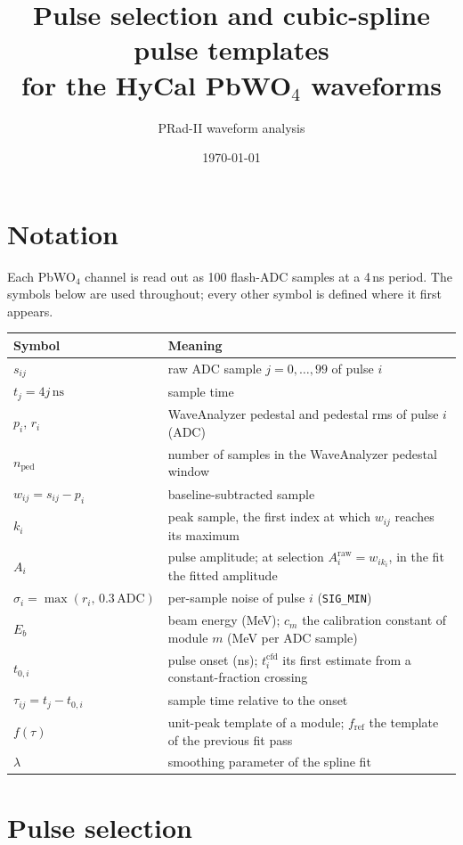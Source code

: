 \documentclass[11pt]{article}
\title{Pulse selection and cubic-spline pulse templates\\ for the HyCal PbWO$_4$ waveforms}
\author{PRad-II waveform analysis}
\date{\today}
\newcommand{\ns}{\,\mathrm{ns}}
\newcommand{\adc}{\,\mathrm{ADC}}
\newcommand{\code}[1]{\texttt{#1}}
\begin{document}
\maketitle

\section{Notation}

Each PbWO$_4$ channel is read out as 100 flash-ADC samples at a 4\,ns period. The symbols below are used throughout; every other symbol is defined where it first appears.

\begin{center}
\begin{tabular}{lp{}}
\toprule
Symbol & Meaning \\
\midrule
$s_{ij}$ & raw ADC sample $j = 0,\dots,99$ of pulse $i$ \\
$t_j = 4j\ns$ & sample time \\
$p_i$, $r_i$ & WaveAnalyzer pedestal and pedestal rms of pulse $i$ (ADC) \\
$n_{\mathrm{ped}}$ & number of samples in the WaveAnalyzer pedestal window \\
$w_{ij} = s_{ij} - p_i$ & baseline-subtracted sample \\
$k_i$ & peak sample, the first index at which $w_{ij}$ reaches its maximum \\
$A_i$ & pulse amplitude; at selection $A_i^{\mathrm{raw}} = w_{ik_i}$, in the fit the fitted amplitude \\
$\sigma_i = \max(r_i,\,0.3\adc)$ & per-sample noise of pulse $i$ (\code{SIG\_MIN}) \\
$E_b$ & beam energy (MeV); $c_m$ the calibration constant of module $m$ (MeV per ADC sample) \\
$t_{0,i}$ & pulse onset (ns); $t^{\mathrm{cfd}}_i$ its first estimate from a constant-fraction crossing \\
$\tau_{ij} = t_j - t_{0,i}$ & sample time relative to the onset \\
$f(\tau)$ & unit-peak template of a module; $f_{\mathrm{ref}}$ the template of the previous fit pass \\
$\lambda$ & smoothing parameter of the spline fit \\
\bottomrule
\end{tabular}
\end{center}

\section{Pulse selection}
\label{sec:selection}
\end{document}
